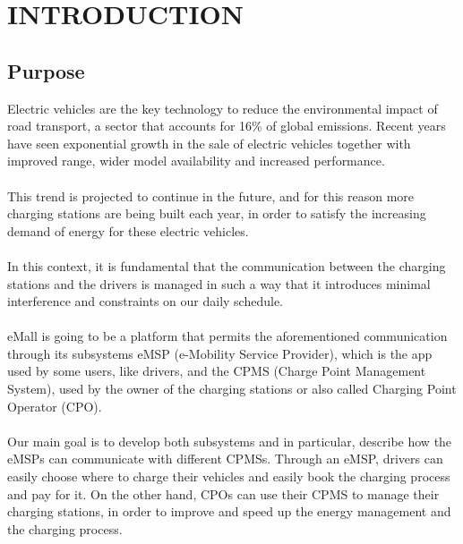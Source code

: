 \newcommand\row{\stepcounter{row}\arabic{row}}
\chapter{INTRODUCTION}
\label{ch:introduction}%

\section{Purpose}
Electric vehicles are the key technology to reduce the environmental impact of road transport, a sector that accounts for 16\% of global emissions. Recent years have seen exponential growth in the sale of electric vehicles together with improved range, wider model availability and increased performance. \\ \\
This trend is projected to continue in the future, and for this reason more charging stations are being built each year, in order to satisfy the increasing demand of energy for these electric vehicles. \\ \\
In this context, it is fundamental that the communication between the charging stations and the drivers is managed in such a way that it introduces minimal interference and constraints on 
our daily schedule. \\ \\
eMall is going to be a platform that permits the aforementioned communication through its subsystems eMSP (e-Mobility Service Provider), which is the app used by some users, like drivers, and the CPMS (Charge Point Management System), used by the owner of the charging stations or also called Charging Point Operator (CPO). \\ \\
Our main goal is to develop both subsystems and in particular, describe how the eMSPs can communicate with different CPMSs. Through an eMSP, drivers can easily choose where to charge their vehicles and easily book the charging process and pay for it. On the other hand, CPOs can use their CPMS to manage their charging stations, in order to improve and speed up the energy management and the charging process.
\label{sec:purpose}
